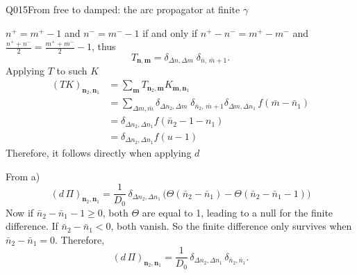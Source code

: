\begin{entry}{Q015}{From free to damped: the arc propagator at finite $\gamma$}
\begin{solution}[a]
$n^+=m^+ - 1$ and $n^-=m^- - 1$ if and only if $n^+ - n^- = m^+ - m^-$ and $\frac{n^+ + n^-}{2} =\frac{m^+ + m^-}{2} -1$, thus
\[
          T_{\mathbf n,\mathbf m}
          =\delta_{\Delta n,\Delta m}\;\delta_{\bar n,\,\bar m+1}.
        \]
Applying $T$ to such $K$
\begin{equation}
    \begin{split}
        (TK)_{\mathbf n_2, \mathbf n_1} &= \sum_{\mathbf m} T_{\mathbf n_2,\mathbf{ m}}K_{\mathbf{ m}, \mathbf n_1}\\
        &= \sum_{\Delta m, \bar m} \delta_{\Delta n_2,\Delta m}\;\delta_{\bar n_2,\,\bar m+1} \delta_{\Delta m,\Delta n_1}\,f(\bar m - \bar n_1) \\
        &=  \delta_{\Delta n_2,\Delta n_1}f(\bar n_2 -1 -n_1)\\
        &=  \delta_{\Delta n_2,\Delta n_1}f(u-1)
    \end{split}
\end{equation}
Therefore, it follows directly when applying $d$

\end{solution}

\begin{solution}[b]
From a)
\begin{equation}
   (d\,\Pi)_{\mathbf n_2,\mathbf n_1}
          =\frac{1}{D_0}\,\delta_{\Delta n_2,\Delta n_1}\,
            \big(\Theta({\bar n_2-\bar n_1}) - \Theta({\bar n_2-\bar n_1}-1)\big)
\end{equation}
Now if $\bar n_2-\bar n_1-1 \geq 0$, both $\Theta$ are equal to 1, leading to a null for the finite difference. If $\bar n_2-\bar n_1<0$, both vanish. So the finite difference only survives when $\bar n_2-\bar n_1 = 0$. Therefore,
\[
          (d\,\Pi)_{\mathbf n_2,\mathbf n_1}
          =\frac{1}{D_0}\,\delta_{\Delta n_2,\Delta n_1}\,
            \delta_{\bar n_2,\bar n_1} .
        \]
\end{solution}


\end{entry}
